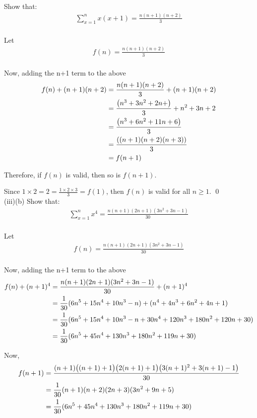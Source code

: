 \documentclass[a4paper,12pt]{article}
\begin{document}
\begin{question}
\qpart[3] %
\qsubpart %
Show that:
\begin{gather*}
	 \sum_{x=1}^{n}x(x+1)=\frac{n(n+1)(n+2)}{3}\\
\end{gather*}


Let
\begin{gather*}
	f(n)=\frac{n(n+1)(n+2)}{3}\\
\end{gather*}

Now, adding the n+1 term to the above
\begin{gather}\notag
\begin{aligned}
	f(n)+(n+1)(n+2)&=\frac{n(n+1)(n+2)}{3}+(n+1)(n+2)\\
	&=\frac{\left(n^3+3n^2+2n+\right)}{3}+n^2+3n+2\\
	&=\frac{\left(n^3+6n^2+11n+6\right)}{3}\\
	&=\frac{\left((n+1)(n+2)(n+3)\right)}{3}\\
	&=f(n+1)
\end{aligned}
\end{gather}

Therefore, if $f(n)$ is valid, then so is $f(n+1)$.

Since $1\times2=2=\frac{1\times2\times3}{3}=f(1)$, then $f(n)$ is valid for all $n\geq1$. \hfill \qed\\[1cm]

\qsubpart (iii)(b)
Show that:
\begin{gather*}
	 \sum_{x=1}^{n}x^4=\frac{n(n+1)(2n+1)(3n^2+3n-1)}{30}\\
\end{gather*}


Let
\begin{gather*}
	f(n)=\frac{n(n+1)(2n+1)(3n^2+3n-1)}{30}\\
\end{gather*}

Now, adding the n+1 term to the above
\begin{align}
	f(n)+(n+1)^4&=\frac{n(n+1)(2n+1)(3n^2+3n-1)}{30}+(n+1)^4\notag \\
	&=\frac{1}{30}(6n^5+15n^4+10n^3-n)+(n^4+4n^3+6n^2+4n+1)\notag \\
	&=\frac{1}{30}(6n^5+15n^4+10n^3-n+30n^4+120n^3+180n^2+120n+30)\notag \\
	&=\frac{1}{30}(6n^5+45n^4+130n^3+180n^2+119n+30)\label{a}
\end{align}

Now,
\begin{align}
	f(n+1)&=\frac{(n+1)\big((n+1)+1\big)\big(2(n+1)+1\big)\big(3(n+1)^2+3(n+1)-1\big)}{30}\notag \\
	&=\frac{1}{30}(n+1)(n+2)(2n+3)(3n^2+9n+5)\notag \\
	&=\frac{1}{30}(6n^5+45n^4+130n^3+180n^2+119n+30)\label{b}
\end{align}


\end{question}
\end{document}
